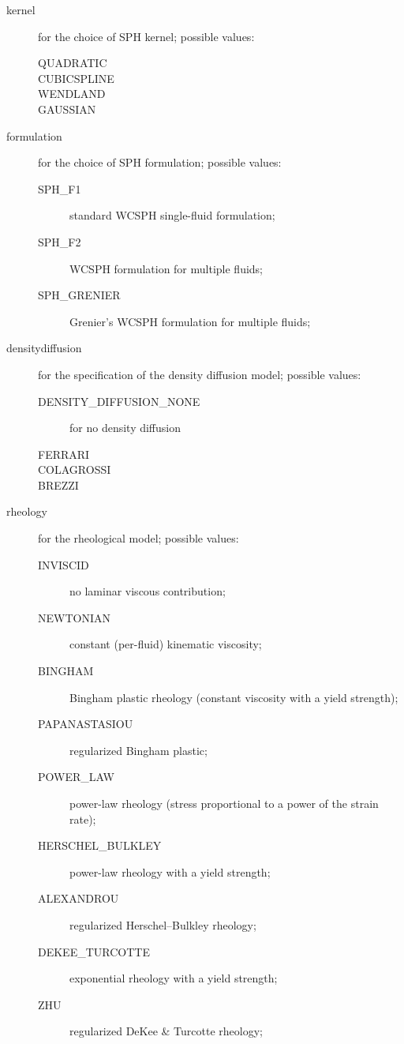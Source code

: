 \documentclass{../GPUSPHtemplate}
\begin{document}
\begin{description}
\item[kernel] for the choice of SPH kernel; possible values:
\begin{description}
\item[QUADRATIC]
\item[CUBICSPLINE]
\item[WENDLAND]
\item[GAUSSIAN]
\end{description}

\item[formulation] for the choice of SPH formulation; possible values:
\begin{description}
\item[SPH\_F1] standard WCSPH single-fluid formulation;
\item[SPH\_F2] WCSPH formulation for multiple fluids;
\item[SPH\_GRENIER] Grenier's WCSPH formulation for multiple fluids;
\end{description}

\item[densitydiffusion] for the specification of the density diffusion model; possible values:
\begin{description}
\item[DENSITY_DIFFUSION_NONE] for no density diffusion
\item[FERRARI]
\item[COLAGROSSI]
\item[BREZZI]
\end{description}

\item[rheology] for the rheological model; possible values:
\begin{description}
\item[INVISCID] no laminar viscous contribution;
\item[NEWTONIAN] constant (per-fluid) kinematic viscosity;
\item[BINGHAM] Bingham plastic rheology (constant viscosity with a yield strength);
\item[PAPANASTASIOU] regularized Bingham plastic;
\item[POWER_LAW] power-law rheology (stress proportional to a power of the strain rate);
\item[HERSCHEL_BULKLEY] power-law rheology with a yield strength;
\item[ALEXANDROU] regularized Herschel--Bulkley rheology;
\item[DEKEE_TURCOTTE] exponential rheology with a yield strength;
\item[ZHU] regularized DeKee \& Turcotte rheology;
\end{description}


\end{description}
\end{document}
